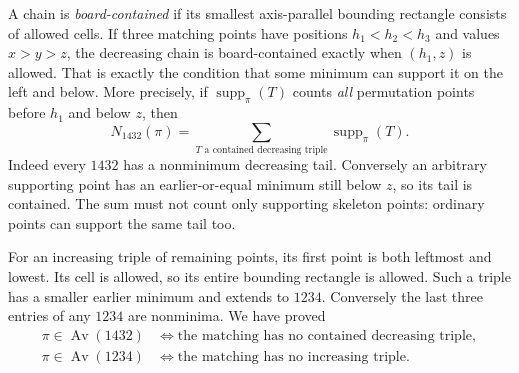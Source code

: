 \documentclass[11pt]{article}
\theoremstyle{remark}\newtheorem{remark}[theorem]{Remark}
\newcommand{\Av}{\operatorname{Av}}
\begin{document}
A chain is \emph{board-contained} if its smallest axis-parallel bounding
rectangle consists of allowed cells. If three matching points have
positions $h_1<h_2<h_3$ and values $x>y>z$, the decreasing chain is
board-contained exactly when $(h_1,z)$ is allowed. That is exactly the
condition that some minimum can support it on the left and below.
More precisely, if $\operatorname{supp}_{\pi}(T)$ counts \emph{all}
permutation points before $h_1$ and below $z$, then
\begin{equation}\label{u1432:eq:support}
 N_{1432}(\pi)=\sum_{T\text{ a contained decreasing triple}}
                   \operatorname{supp}_{\pi}(T).
\end{equation}
Indeed every $1432$ has a nonminimum decreasing tail. Conversely an
arbitrary supporting point has an earlier-or-equal minimum still below
$z$, so its tail is contained. The sum must not count only supporting
skeleton points: ordinary points can support the same tail too.

For an increasing triple of remaining points, its first point is both
leftmost and lowest. Its cell is allowed, so its entire bounding rectangle
is allowed. Such a triple has a smaller earlier minimum and extends to
$1234$. Conversely the last three entries of any $1234$ are nonminima.
We have proved
\begin{align*}
 \pi\in\Av(1432)&\iff\text{the matching has no contained decreasing triple},\\
 \pi\in\Av(1234)&\iff\text{the matching has no increasing triple}.
\end{align*}
\end{document}
